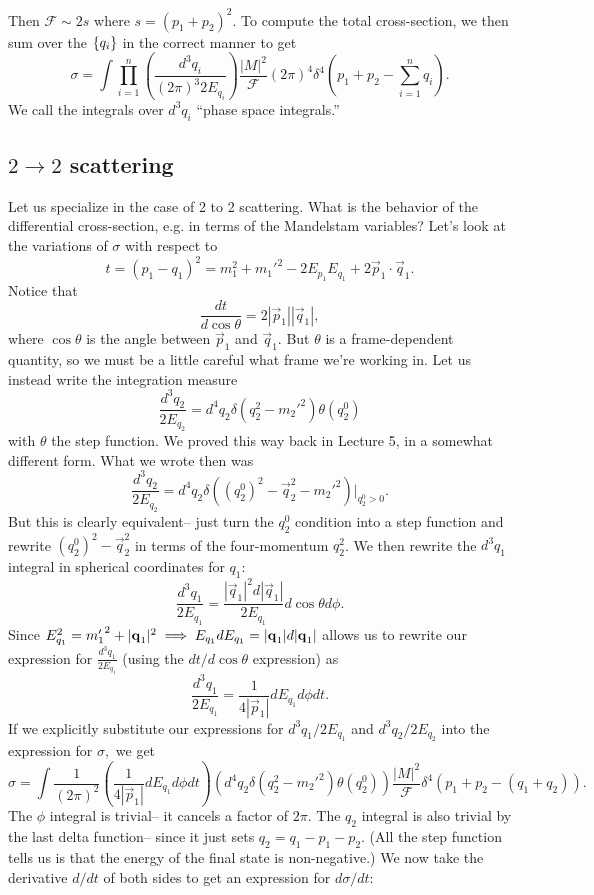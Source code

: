 Then $\mathcal{F}\sim 2s$ where $s=(p_1+p_2)^2$. To compute the total cross-section, we then sum over the $\{q_i\}$ in the correct manner to get
$$\sigma = \int \prod_{i=1}^n \left(\frac{d^3 q_i}{(2\pi)^3 2E_{q_i}}\right)\frac{|M|^2}{\mathcal{F}} (2\pi)^4 \delta^4(p_1+p_2 -\sum_{i=1}^n q_i).$$
We call the integrals over $d^3q_i$ ``phase space integrals.''

\subsection*{$2\to 2$ scattering}
Let us specialize in the case of 2 to 2 scattering. What is the behavior of the differential cross-section, e.g. in terms of the Mandelstam variables? Let's look at the variations of $\sigma$ with respect to 
$$t=(p_1-q_1)^2=m_1^2+{m_1'}^2-2E_{p_1}E_{q_1}+2 \vec p_1 \cdot \vec q_1.$$ Notice that
$$\frac{dt}{d\cos\theta}=2|\vec p_1||\vec q_1|,$$
where $\cos\theta$ is the angle between $\vec p_1$ and $\vec q_1$. But $\theta$ is a frame-dependent quantity, so we must be a little careful what frame we're working in. Let us instead write the integration measure
$$\frac{d^3q_2}{2E_{q_2}}=d^4 q_2\delta(q_2^2-{m_2'}^2) \theta(q_2^0)$$
with $\theta$ the step function. We proved this way back in Lecture 5, in a somewhat different form. What we wrote then was 
$$\frac{d^3q_2}{2E_{q_2}}=d^4 q_2 \delta((q_2^0)^2-\vec q_2^2 -{m_2'}^2)|_{q_2^0>0}.$$
But this is clearly equivalent-- just turn the $q_2^0$ condition into a step function and rewrite $(q_2^0)^2-\vec q_2^2$ in terms of the four-momentum $q_2^2$.
We then rewrite the $d^3q_1$ integral in spherical coordinates for $q_1$:
$$\frac{d^3q_1}{2E_{q_1}}=\frac{|\vec q_1|^2 d|\vec q_1|}{2E_{q_1}} d\cos\theta d\phi.$$
Since $E_{q_1}^2={m_1'}^2 +|\boldsymbol{\mathbf{q}}_1|^2 \implies E_{q_1}dE_{q_1}=\lvert\boldsymbol{\mathbf{q}}_1\rvert d\lvert\boldsymbol{\mathbf{q}}_1\rvert$ allows us to rewrite our expression for $\frac{d^3q_1}{2E_{q_1}}$ (using the $dt/d\cos\theta$ expression) as
$$\frac{d^3q_1}{2E_{q_1}}=\frac{1}{4|\vec p_1|} dE_{q_1}d\phi dt.$$
If we explicitly substitute our expressions for $d^3q_1/2E_{q_1}$ and $d^3q_2/2E_{q_2}$ into the expression for $\sigma,$
we get
$$\sigma=\int \frac{1}{(2\pi)^2} \left(\frac{1}{4|\vec p_1|} dE_{q_1} d\phi dt\right)\left(d^4 q_2 \delta(q_2^2 -{m_2'}^2)\theta(q_2^0)\right)\frac{|M|^2}{\mathcal{F}}\delta^4 (p_1+p_2-(q_1+q_2)).$$
The $\phi$ integral is trivial-- it cancels a factor of $2\pi$. The $q_2$ integral is also trivial by the last delta function-- since it just sets $q_2=q_1-p_1-p_2$. (All the step function tells us is that the energy of the final state is non-negative.) We now take the derivative $d/dt$ of both sides to get an expression for $d\sigma/dt$:

